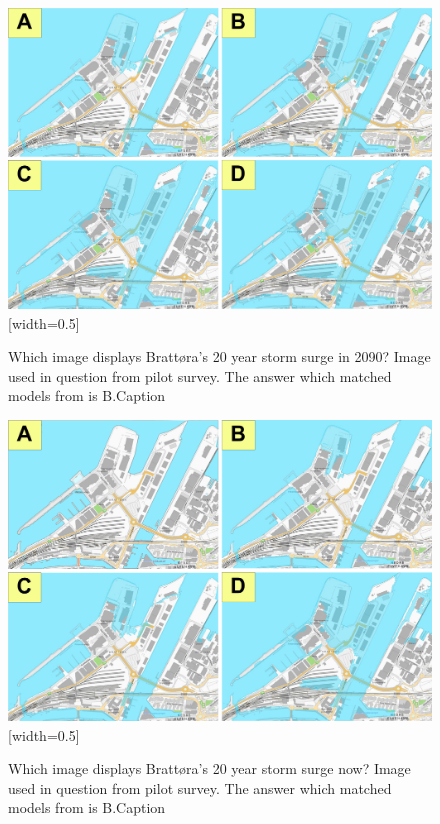\begin{figure}[h]
    \centering
    \includegraphics{fig/brattora question on 2090 20 yr storm surge quadrant.png} [width=0.5\textwidth]
    \caption{Which image displays Brattøra's 20 year storm surge in 2090? Image used in question from pilot survey. The answer which matched models from \cite{kartverket_se_2021} is B.Caption}
    \label{fig:brattora_2090_stormsurge}
\end{figure}

\begin{figure}[h]
    \centering
    \includegraphics{fig/brattora question on 2022 20 yr storm surge quadrant.png} [width=0.5\textwidth]
    \caption{Which image displays Brattøra's 20 year storm surge now? Image used in question from pilot survey. The answer which matched models from \cite{kartverket_se_2021} is B.Caption}
    \label{fig:brattora_2022_stormsurge}
\end{figure}


